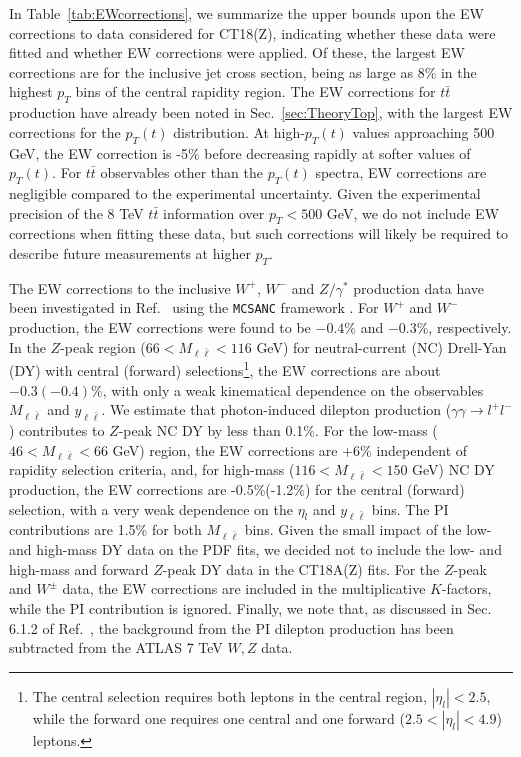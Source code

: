 In Table~\ref{tab:EWcorrections}, we summarize the upper bounds upon the EW 
corrections to data considered for CT18(Z), indicating whether these data were
fitted and whether EW corrections were applied. Of these, the largest EW
corrections are for the inclusive jet cross section, being as large as 8\% in
the highest $p_{T}$ bins of the central rapidity region. 
The EW corrections for $t\bar{t}$ production have already been noted in 
Sec.~\ref{sec:TheoryTop}, with the largest EW corrections for the $p_{T}(t)$ 
distribution. At high-$p_{T}(t)$ values approaching 500 GeV, the EW correction is 
-5\% before decreasing rapidly at softer values of $p_{T}(t)$. 
For $t\bar{t}$ observables other than the $p_{T}(t)$ spectra, EW corrections are
negligible compared to the experimental uncertainty. Given the experimental precision of
the 8 TeV $t\bar{t}$ information over $p_T\! <\! 500$ GeV, we do not include EW corrections
when fitting these data, but such corrections will likely be required to describe future
measurements at higher $p_T$.

The EW corrections to the inclusive $W^+$, $W^-$ and $Z/\gamma^*$ 
production data have been investigated in Ref.~\cite{Aaboud:2016btc} 
using the \texttt{MCSANC} framework \cite{Arbuzov:2015yja}. 
For $W^{+}$ and $W^{-}$ production, the
EW corrections were found to be $-0.4$\% and $-0.3$\%, respectively. 
In the $Z$-peak region ($66\!<\!M_{\ell \bar \ell}\!<\!116$ GeV) for neutral-current (NC)
Drell-Yan (DY) with central (forward) selections\footnote{The central selection requires both leptons in the central region, $|\eta_l|<2.5$, while the forward one requires one central and one forward ($2.5<|\eta_l|<4.9$) leptons.}, the EW 
corrections are about $-0.3(-0.4)\%$, with only a weak kinematical dependence 
on the observables $M_{\ell \bar \ell}$ and $y_{\ell \bar \ell}$. We estimate that photon-induced dilepton
production ($\gamma\gamma\to l^{+}l^{-}$) contributes to $Z$-peak NC DY 
by less than 0.1\%. For the low-mass ($46\!<\!M_{\ell \bar \ell}\!<\!66$ GeV) region, the EW corrections 
are +6\% independent of rapidity selection criteria, and, for high-mass ($116\!<\!M_{\ell \bar \ell}\!<\!150$ GeV) NC DY production, the EW corrections are -0.5\%(-1.2\%) for the central (forward) selection, with a very weak dependence on the $\eta_l$ and $y_{\ell \bar \ell}$ bins. The PI contributions are 1.5\% for both $M_{\ell \bar \ell}$ bins.
Given the small impact of the low- and high-mass DY data on the PDF fits, we decided not to 
include the low- and high-mass and forward $Z$-peak DY data in the CT18A(Z) fits. 
For the $Z$-peak and $W^\pm$ data, the EW corrections are included in the multiplicative $K$-factors, while the PI contribution is ignored.
Finally, we note that, as discussed in Sec. 6.1.2 of Ref.~\cite{Aaboud:2016btc}, the background from the PI dilepton production has been subtracted from the ATLAS 7 TeV $W, Z$ data. 

